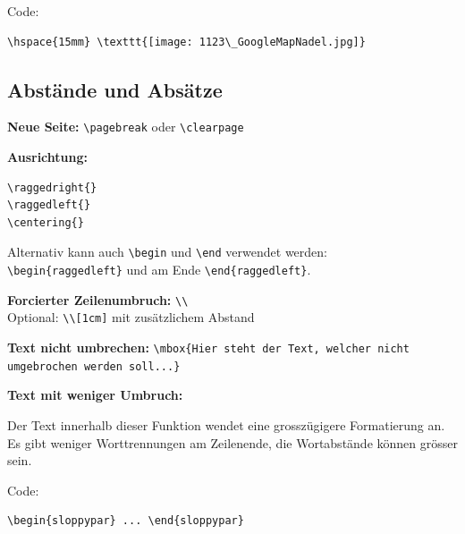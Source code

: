 Code:

\begin{verbatim}
\hspace{15mm} \texttt{[image: 1123\_GoogleMapNadel.jpg]}
\end{verbatim}




\subsection{Abstände und Absätze}

\textbf{Neue Seite:}
\verb+\pagebreak+ oder \verb+\clearpage+

\vspace{\baselineskip}

\textbf{Ausrichtung:}

\begin{verbatim}
\raggedright{}
\raggedleft{}
\centering{}
\end{verbatim}

Alternativ kann auch \verb+\begin+ und \verb+\end+ verwendet werden:\\
\verb+\begin{raggedleft}+ und am Ende \verb+\end{raggedleft}+.

\vspace{\baselineskip}

\textbf{Forcierter Zeilenumbruch:} \verb+\\+\\
Optional: \verb+\\[1cm]+ mit zusätzlichem Abstand

\vspace{\baselineskip}

\textbf{Text nicht umbrechen:}
\verb+\mbox{Hier steht der Text, welcher nicht umgebrochen werden soll...}+

\vspace{\baselineskip}

\textbf{Text mit weniger Umbruch:}

Der Text innerhalb dieser Funktion wendet eine grosszügigere Formatierung an. Es gibt weniger Worttrennungen am Zeilenende, die Wortabstände können grösser sein.

Code:

\begin{verbatim}
\begin{sloppypar} ... \end{sloppypar}
\end{verbatim}

